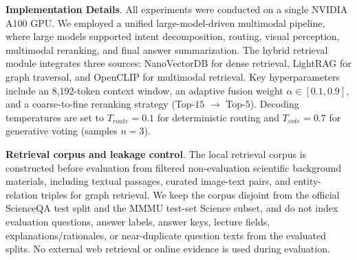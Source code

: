\documentclass[a4paper, fleqn]{cas-dc}
\begin{document}
\textbf{Implementation Details}. All experiments were conducted on a single NVIDIA A100 GPU. We employed a unified large-model-driven multimodal pipeline, where large models supported intent decomposition, routing, visual perception, multimodal reranking, and final answer summarization.
The hybrid retrieval module integrates three sources: NanoVectorDB for dense retrieval, LightRAG for graph traversal, and OpenCLIP for multimodal retrieval. Key hyperparameters include an 8,192-token context window, an adaptive fusion weight $\alpha \in [0.1, 0.9]$, and a coarse-to-fine reranking strategy (Top-$15$ $\to$ Top-$5$).
Decoding temperatures are set to $T_{route} = 0.1$ for deterministic routing and $T_{vote} = 0.7$ for generative voting (samples $n = 3$).

\textbf{Retrieval corpus and leakage control}. The local retrieval corpus is constructed before evaluation from filtered non-evaluation scientific background materials, including textual passages, curated image-text pairs, and entity-relation triples for graph retrieval.
We keep the corpus disjoint from the official ScienceQA test split and the MMMU test-set Science subset, and do not index evaluation questions, answer labels, answer keys, lecture fields, explanations/rationales, or near-duplicate question texts from the evaluated splits.
No external web retrieval or online evidence is used during evaluation.
\end{document}
